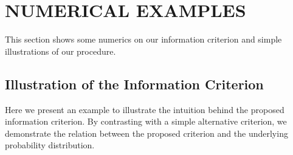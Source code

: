 \documentclass{wscpaperproc}
\theoremstyle{wsc}
\begin{document}

\section{NUMERICAL EXAMPLES} \label{sec:numerical}
This section shows some numerics on our information criterion and simple illustrations of our procedure.

\subsection{Illustration of the Information Criterion}


Here we present an example to illustrate the intuition behind the proposed information criterion. By contrasting with a simple alternative criterion, we demonstrate the relation between the proposed criterion and the underlying probability distribution.
\end{document}
